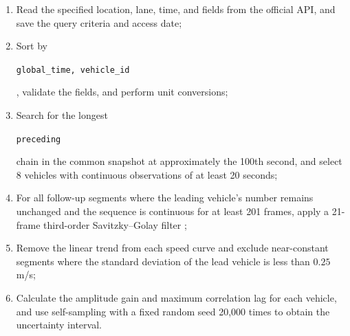 \documentclass[11pt,a4paper,openany]{book}
\numberwithin{equation}{chapter}
\numberwithin{figure}{chapter}
\numberwithin{table}{chapter}
\begin{document}
\begin{enumerate}[leftmargin=1.6em,itemsep=3pt]
\item




 Read the specified location, lane, time, and fields from the official API, and save the query criteria and access date;







\item




 Sort by




\texttt{global\_time, vehicle\_id}




, validate the fields, and perform unit conversions;







\item




 Search for the longest




\texttt{preceding}




 chain in the common snapshot at approximately the 100th second, and select 8 vehicles with continuous observations of at least 20 seconds;


\item For all follow-up segments where the leading vehicle’s number remains unchanged and the sequence is continuous for at least 201 frames, apply a 21-frame third-order Savitzky–Golay filter \cite{savitzky1964};







\item




 Remove the linear trend from each speed curve and exclude near-constant segments where the standard deviation of the lead vehicle is less than $0.25$ m/s;







\item




 Calculate the amplitude gain and maximum correlation lag for each vehicle, and use self-sampling with a fixed random seed 20,000 times to obtain the uncertainty interval.







\end{enumerate}
\end{document}
